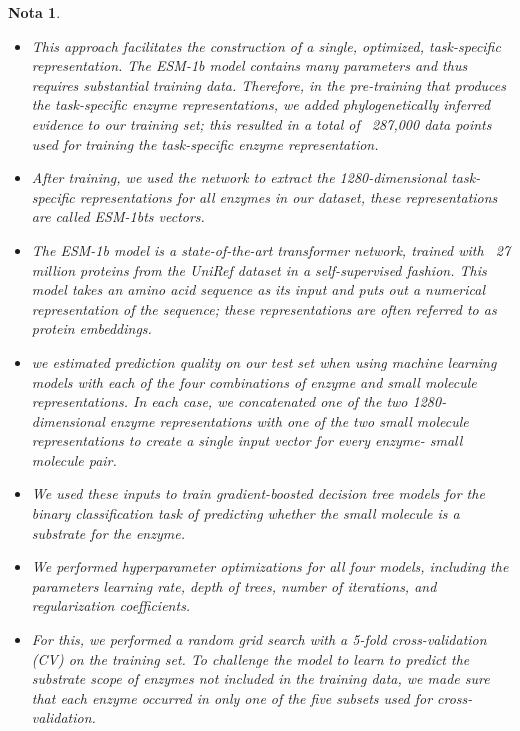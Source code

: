 \documentclass[12pt]{article}
\newtheorem{Note}{Nota}%
\begin{document}
\begin{Note}
\begin{itemize}
\item This approach facilitates the construction of a single, optimized, task-specific representation. The ESM-1b model contains many parameters and thus requires substantial training data. Therefore, in the pre-training that produces the task-specific enzyme representations, we added phylogenetically inferred evidence to our training set; this resulted in a total of ~287,000 data points used for training the task-specific enzyme representation. 


\item After training, we used the network to extract the 1280-dimensional task-specific representations for all enzymes in our
dataset, these representations are called ESM-1bts vectors.

\item The ESM-1b model is a state-of-the-art transformer network\cite{2.47}, trained with ~27 million proteins from the UniRef dataset\cite{2.48} in a self-supervised fashion\cite{2.34}. This model takes an amino acid sequence as its input and puts out a numerical representation of the sequence; these representations are often referred to as protein embeddings.


\item we estimated prediction quality on our test set when using machine learning models with each of the four combinations of enzyme and small molecule representations. In each case, we concatenated one of the two 1280-dimensional enzyme representations with one of the two small molecule representations to create a single input vector for every enzyme- small molecule pair. 

\item We used these inputs to train gradient-boosted decision tree models\cite{2.50} for the binary classification task of predicting whether the small molecule is a substrate for the enzyme.

\item We performed hyperparameter optimizations for all four models, including the parameters learning rate, depth of trees, number of iterations, and regularization coefficients.

\item For this, we performed a random grid search with a 5-fold cross-validation (CV) on the training set. To challenge the model to learn to predict the substrate scope of enzymes not included in the training data, we made sure that each enzyme occurred in only one of the five subsets used for cross-validation. 
 

\end{itemize}
\end{Note}
\end{document}
